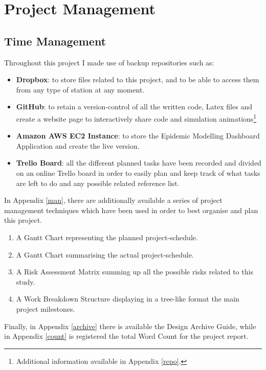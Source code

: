 \chapter{Project Management}

\label{ch:management}
\setlength\lineskip{0pt}
\vspace*{15pt}

\section{Time Management}
Throughout this project I made use of backup repositories such as:

\begin{itemize}
\itemsep0em
\item \textbf{Dropbox}: to store files related to this project, and to be able to access them from any type of station at any moment.
\item \textbf{GitHub}: to retain a version-control of all the written code, Latex files and create a website page to interactively share code and simulation animations\footnote{Additional information available in Appendix \ref{repo}.}
\item \textbf{Amazon AWS EC2 Instance}: to store the Epidemic Modelling Dashboard Application and create the live version.
\item \textbf{Trello Board}: all the different planned tasks have been recorded and divided on an online Trello board in order to easily plan and keep track of what tasks are left to do and any possible related reference list.
\end{itemize}

In Appendix \ref{man}, there are additionally available a series of project management techniques which have been used in order to best organise and plan this project.

\begin{enumerate}
\itemsep0em
\item A Gantt Chart representing the planned project-schedule.
\item A Gantt Chart summarising the actual project-schedule.
\item A Risk Assessment Matrix summing up all the possible risks related to this study.
\item A Work Breakdown Structure displaying in a tree-like format the main project milestones. 
\end{enumerate}

Finally, in Appendix \ref{archive} there is available the Design Archive Guide, while in Appendix \ref{count} is registered the total Word Count for the project report.

